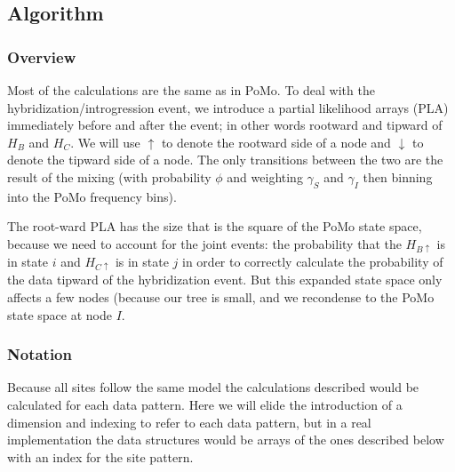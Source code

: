 \documentclass{article}
\begin{document}
\subsection{Algorithm}
\subsubsection{Overview}
Most of the calculations are the same as in PoMo.
To deal with the hybridization/introgression event, we introduce a partial likelihood arrays (PLA) immediately before and after the event; in other words rootward and tipward of $H_B$ and $H_C$.
We will use $\uparrow$ to denote the rootward side of a node and $\downarrow$ to denote the tipward side of a node.
The only transitions between the two are the result of the mixing (with probability $\phi$ and weighting $\gamma_S$ and $\gamma_I$ then binning into the PoMo frequency bins).


The root-ward PLA has the size that is the square of the PoMo state space, because we need to account for the joint events: the probability that the $H_{B\uparrow}$ is in state $i$ and $H_{C\uparrow}$ is in state $j$ in order to correctly calculate the probability of the data tipward of the hybridization event.
But this expanded state space only affects a few nodes (because our tree is small, and we recondense to the PoMo state space at node $I$.

\subsubsection{Notation}
Because all sites follow the same model the calculations described would be calculated for each data pattern.
Here we will elide the introduction of a dimension and indexing to refer to each data pattern, but in a real implementation the data structures would be arrays of the ones described below with an index for the site pattern.







\end{document}
